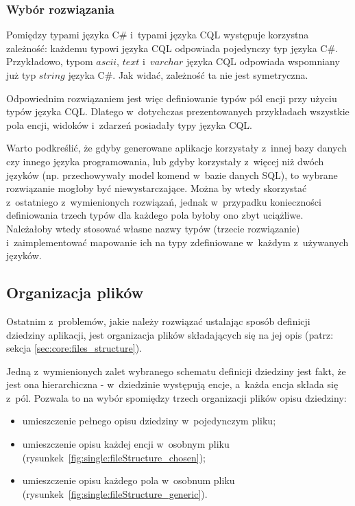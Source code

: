\subsubsection{Wybór rozwiązania}

Pomiędzy typami języka C\# i~typami języka CQL występuje korzystna zależność: każdemu typowi języka CQL odpowiada pojedynczy typ języka C\#.
Przykładowo, typom $ascii$, $text$ i~$varchar$ języka CQL odpowiada wspomniany już typ $string$ języka C\#.
Jak widać, zależność ta nie jest symetryczna.

Odpowiednim rozwiązaniem jest więc definiowanie typów pól encji przy użyciu typów języka CQL.
Dlatego w~dotychczas prezentowanych przykładach wszystkie pola encji, widoków i~zdarzeń posiadały typy języka CQL.

Warto podkreślić, że gdyby generowane aplikacje korzystały z~innej bazy danych czy innego języka programowania, lub gdyby korzystały z~więcej niż dwóch języków (np. przechowywały model komend w~bazie danych SQL), to wybrane rozwiązanie mogłoby być niewystarczające.
Można by wtedy skorzystać z~ostatniego z~wymienionych rozwiązań, jednak w~przypadku konieczności definiowania trzech typów dla każdego pola byłoby ono zbyt uciążliwe.
Należałoby wtedy stosować własne nazwy typów (trzecie rozwiązanie) i~zaimplementować mapowanie ich na typy zdefiniowane w~każdym z~używanych języków.


\subsection{Organizacja plików}

Ostatnim z~problemów, jakie należy rozwiązać ustalając sposób definicji dziedziny aplikacji, jest organizacja plików składających się na jej opis (patrz: sekcja \ref{sec:core:files_structure}).

Jedną z~wymienionych zalet wybranego schematu definicji dziedziny jest fakt, że jest ona hierarchiczna - w~dziedzinie występują encje, a~każda encja składa się z~pól.
Pozwala to na wybór spomiędzy trzech organizacji plików opisu dziedziny:

\begin{itemize}
 \item umieszczenie pełnego opisu dziedziny w~pojedynczym pliku;
 \item umieszczenie opisu każdej encji w~osobnym pliku (rysunkek~\ref{fig:single:fileStructure_chosen});
 \item umieszczenie opisu każdego pola w~osobnum pliku (rysunkek~\ref{fig:single:fileStructure_generic}).
\end{itemize}

